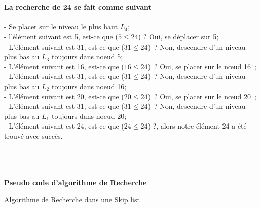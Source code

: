\documentclass[hidelinks,a4paper,12pt]{article}
\begin{document}
~\\~\\
\textbf{La recherche de 24 se fait comme suivant} 
~\\~\\ 
- Se placer sur le niveau le plus haut $L_4$;\medskip \\ 
- l’élément suivant est 5, est-ce que ($5 \le 24$) ? Oui, se déplacer sur 5; \medskip \\
- L’élément suivant est 31, est-ce que ($31 \le 24$) ? Non, descendre d’un niveau plus bas au $L_3$ toujours dans noeud 5;\medskip \\
- L’élément suivant est 16, est-ce que ($16 \le 24$) ? Oui, se placer sur le nœud 16 ;\medskip \\
- L’élément suivant est 31, est-ce que ($31 \le 24$) ? Non, descendre d’un niveau plus bas au $L_2$ toujours dans noeud 16;\medskip \\
- L’élément suivant est 20, est-ce que ($20 \le 24$) ? Oui, se placer sur le nœud 20 ;\medskip \\
- L’élément suivant est 31, est-ce que ($31 \le 24$) ? Non, descendre d’un niveau plus bas au $L_1$ toujours dans noeud 20;\medskip \\
- L’élément suivant est 24, est-ce que ($24 \le 24$) ?, alors notre élément 24 a été trouvé avec succès.

~\\~\\ ~\\
 \textbf {Pseudo code d'algorithme de Recherche} \medskip  \\
 
 \begin{algorithm}[H]
	\DontPrintSemicolon	
	\caption{Algorithme de Recherche dans une Skip list}
 \end{algorithm}
\end{document}

